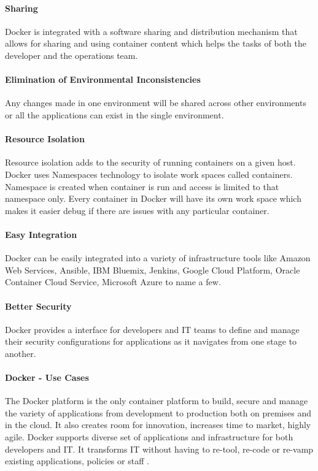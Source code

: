 \documentclass[sigconf]{acmart}
\begin{document}
	\paragraph{Sharing}
	Docker is integrated with a software sharing and distribution mechanism that allows for sharing and using container content which helps the tasks of both the developer and the operations team.
	\paragraph{Elimination of Environmental Inconsistencies}
	Any changes made in one environment will be shared across other environments or all the applications can exist in the single environment.
	\paragraph{Resource Isolation}
	Resource isolation adds to the security of running containers on a given host. Docker uses Namespaces technology to isolate work spaces called containers. Namespace is created when container is run and access is limited to that namespace only. Every container in Docker will have its own work space which makes it easier debug if there are issues with any particular container.
	\paragraph{Easy Integration}
	Docker can be easily integrated into a variety of infrastructure tools like Amazon Web Services, Ansible, IBM Bluemix, Jenkins, Google Cloud Platform, Oracle Container Cloud Service, Microsoft Azure to name a few.
	\paragraph{Better Security}
	Docker provides a interface for developers and IT teams to define and manage their security configurations for applications as it navigates from one stage to another.
	
	\paragraph{Docker - Use Cases}
	The Docker platform is the only container platform to build, secure and manage the variety of applications from development to production both on premises and in the cloud. It also creates room for innovation, increases time to market, highly agile. Docker supports diverse set of applications and infrastructure for both developers and IT. It transforms IT without having to re-tool, re-code or re-vamp existing applications, policies or staff \cite{hackernoon}.
\end{document}
